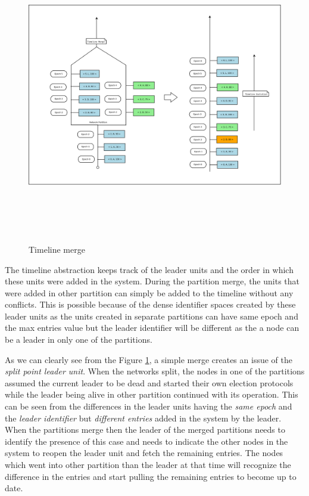 \documentclass[a4paper,11pt]{kth-mag}
\begin{document}
\begin{figure}
	\includegraphics[width=14cm, height= 13cm]{timeline-merge}

	\caption{Timeline merge}
	\label{fig:timelineMerge}
\end{figure}


\par The timeline abstraction keeps track of the leader units and the order in which these units were added in the system. During the partition merge, the units that were added in other partition can simply be added to the timeline without any conflicts. This is possible because of the dense identifier spaces created by these leader units as the units created in separate partitions can have same epoch and the max entries value but the leader identifier will be different as the a node can be a leader in only one of the partitions. 

\par As we can clearly see from the Figure \ref{fig:timelineMerge}, a simple merge creates an issue of the \textit{split point leader unit}. When the networks split, the nodes in one of the partitions assumed the current leader to be dead and started their own election protocols while the leader being alive in other partition continued with its operation. This can be seen from the differences in the leader units having the \textit{same epoch} and the \textit{leader identifier}  but \textit{different entries} added in the system by the leader. When the partitions merge then the leader of the merged partitions needs to identify the presence of this case and needs to indicate the other nodes in the system to reopen the leader unit and fetch the remaining entries. The nodes which went into other partition than the leader at that time will recognize the difference in the entries and start pulling the remaining entries to become up to date.
\end{document}

